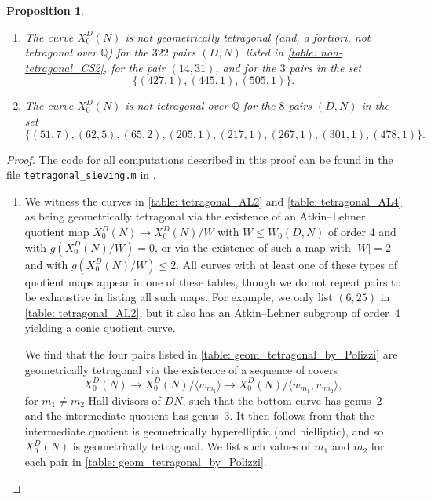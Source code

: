 \documentclass[11pt,reqno]{amsart}
\newcommand{\Q}{\mathbb{Q}}
\newtheorem{proposition}[theorem]{Proposition}
\theoremstyle{definition}
\begin{document}
\begin{proposition}
\begin{enumerate}
    \item The curve $X_0^D(N)$ is not geometrically tetragonal (and, \emph{a fortiori}, not tetragonal over $\Q$) for the $322$ pairs $(D,N)$ listed in \cref{table: non-tetragonal_CS2}, for the pair $(14,31)$, and for the $3$ pairs in the set
    \[ \{ (427,1), (445, 1), (505,1)\}. \]
    
     \item The curve $X_0^D(N)$ is not tetragonal over $\Q$ for the $8$ pairs $(D,N)$ in the set
    \[ \{     ( 51, 7 ),
    ( 62, 5 ),
    ( 65, 2 ),
    ( 205, 1 ),
    ( 217, 1 ),
    ( 267, 1 ),
    ( 301, 1 ),
    ( 478, 1 )\}. \]
\end{enumerate}
\end{proposition}
\begin{proof}
The code for all computations described in this proof can be found in the file \texttt{tetragonal{\_}sieving.m} in \cite{MPSSRep}.

\begin{enumerate}
    \item We witness the curves in \cref{table: tetragonal_AL2} and \cref{table: tetragonal_AL4} as being geometrically tetragonal via the existence of an Atkin--Lehner quotient map $X_0^D(N) \to X_0^D(N)/W$ with $W \leq W_0(D,N)$ of order $4$ and with $g(X_0^D(N)/W) = 0$, or via the existence of such a map with $|W| = 2$ and with $g(X_0^D(N)/W) \leq 2$. All curves with at least one of these types of quotient maps appear in one of these tables, though we do not repeat pairs to be exhaustive in listing all such maps. For example, we only list $(6,25)$ in \cref{table: tetragonal_AL2}, but it also has an Atkin--Lehner subgroup of order~$4$ yielding a conic quotient curve. 
    
    We find that the four pairs listed in \cref{table: geom_tetragonal_by_Polizzi} are geometrically tetragonal via the existence of a sequence of covers 
    \[ X_0^D(N) \to X_0^D(N) / \langle w_{m_1} \rangle \to X_0^D(N) / \langle w_{m_1}, w_{m_2} \rangle, \]
    for $m_1 \neq m_2$ Hall divisors of $DN$, such that the bottom curve has genus~$2$ and the intermediate quotient has genus~$3$. It then follows from \cite[Theorem~3.4]{Pol06} that the intermediate quotient is geometrically hyperelliptic (and bielliptic), and so $X_0^D(N)$ is geometrically tetragonal. We list such values of $m_1$ and $m_2$ for each pair in \cref{table: geom_tetragonal_by_Polizzi}.
    


\end{enumerate}
\end{proof}
\end{document}
